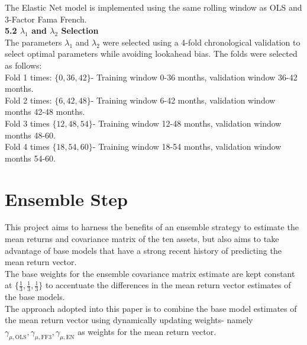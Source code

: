 \documentclass{article}
\begin{document}
The Elastic Net model is implemented using the same rolling window as OLS and 3-Factor Fama French.\\

\textbf{5.2 $\lambda_1$ and $\lambda_2$ Selection}\\

The parameters $\lambda_1$ and $\lambda_2$ were selected using a 4-fold chronological validation to select optimal parameters while avoiding lookahead bias. The folds were selected as follows:\\

Fold 1 times: $\{0,36,42\}$- Training window 0-36 months, validation window 36-42 months.\\

Fold 2 times: $\{6,42,48\}$- Training window 6-42 months, validation window months 42-48 months.\\

Fold 3 times $\{12,48,54\}$- Training window 12-48 months, validation window months 48-60.\\

Fold 4 times $\{18,54,60\}$- Training window 18-54 months, validation window months 54-60.\\

\break

\section{Ensemble Step}

\vspace{5mm}

This project aims to harness the benefits of an ensemble strategy to estimate the mean returns and covariance matrix of the ten assets, but also aims to take advantage of base models that have a strong recent history of predicting the mean return vector.\\

The base weights for the ensemble covariance matrix estimate are kept constant at $\{\frac{1}{3}, \frac{1}{3}, \frac{1}{3}\}$ to accentuate the differences in the mean return vector estimates of the base models.\\

The approach adopted into this paper is to combine the base model estimates of the mean return vector using dynamically updating weights- namely $\gamma_{\mu, \text{OLS}}, \gamma_{\mu, \text{FF3}}, \gamma_{\mu, \text{EN}}$ as weights for the mean return vector.\\
\end{document}
